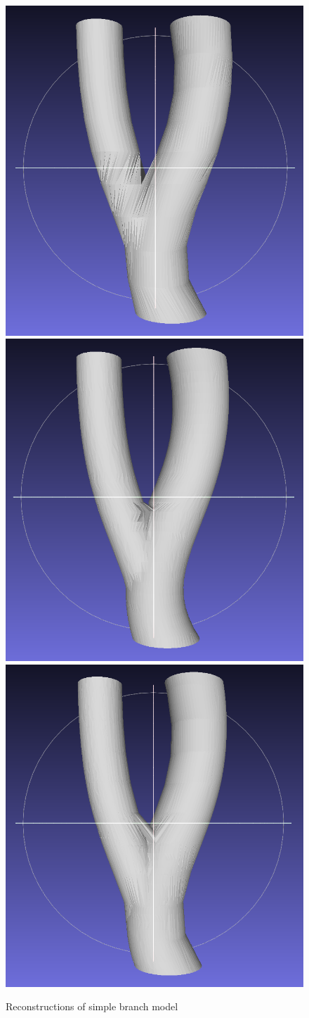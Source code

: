 \documentclass[11p, titlepage]{article}
\newcommand{\reconstructionright}{0.67}
\begin{document}
\begin{figure}[h!]
\begin{minipage}[b]{\reconstructionright\linewidth}
       \hfill
       {\includegraphics[width=.48\linewidth]{reconstructions/dtw-simple-branch-10}}
       \hfill
       {\includegraphics[width=.48\linewidth]{reconstructions/cspa50-simple-branch-30}}%
       \hfill
       {\includegraphics[width=.48\linewidth]{reconstructions/cspa50-simple-branch-10}}
     \end{minipage}%
        \caption{Reconstructions of simple branch model}
        \label{fig:simple_branch_reconstructions}
\end{figure}
\end{document}
